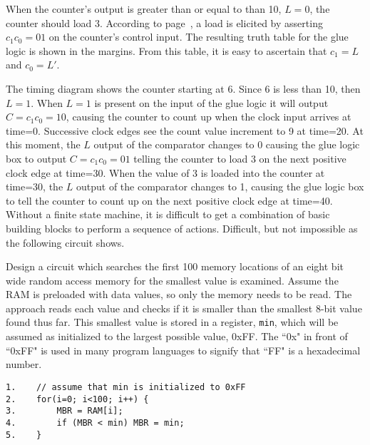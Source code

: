 When the counter's output is greater than or equal to than 10, $L=0$,
the counter should load 3.  According to
page~\pageref{page:counter}, a load is elicited by asserting
$c_1c_0=01$ on the counter's control input.  The
resulting truth table for the glue logic is shown in the margins.
From this table, it is easy to ascertain that $c_1 = L$ and $c_0 = L'$.


The timing diagram shows the counter starting at 6.  Since 6 is less
than 10, then $L=1$.  When $L=1$ is present on the input of the
glue logic it will output $C=c_1c_0=10$, causing the counter
to count up when the clock input arrives at time=0.  Successive clock edges
see the count value increment to 9 at time=20.  At this moment, the $L$ output
of the comparator changes to 0 causing the glue logic box to output
$C=c_1c_0=01$ telling the counter to load 3 on the next positive clock edge
at time=30.  When the value of 3 is loaded into the counter at time=30, the
$L$ output of the comparator changes to 1, causing the glue logic box to
tell the counter to count up on the next positive clock edge at time=40.
Without a finite state machine, it is difficult to get a combination of basic
building blocks to perform a sequence of actions. Difficult, but not
impossible as the following circuit shows.

Design a circuit which searches the first
100 memory locations of an eight bit wide random access memory for the smallest
value is examined.  Assume the RAM is preloaded with data values, so
only the memory needs to be read.  The approach reads each value
and checks if it is smaller than the smallest 8-bit value found
thus far.  This smallest value is stored in a register, \verb+min+, which
will be assumed as initialized to the largest possible value, 0xFF.  The ``0x"
in front of ``0xFF" is used in many program languages to signify that
``FF" is a hexadecimal number.
\label{page:minsearch}

\begin{verbatim}
1.    // assume that min is initialized to 0xFF
2.    for(i=0; i<100; i++) {
3.        MBR = RAM[i];
4.        if (MBR < min) MBR = min;
5.    }
\end{verbatim}

